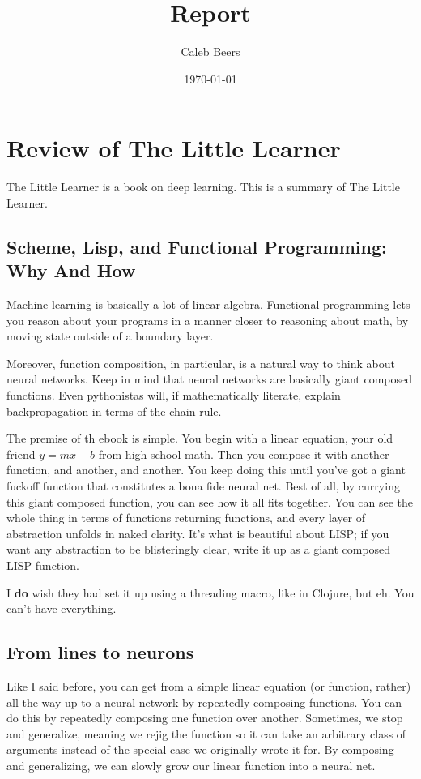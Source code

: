\documentclass[11pt]{article}
\author{Caleb Beers}
\date{\today}
\title{Report}
\begin{document}
\maketitle
\tableofcontents

\section{Review of The Little Learner}
\label{sec:orgade1d67}
The Little Learner is a book on deep learning. This is a summary of The Little Learner.
\subsection{Scheme, Lisp, and Functional Programming: Why And How}
\label{sec:org481af56}
Machine learning is basically a lot of linear algebra. Functional programming lets you reason about your programs in a manner closer to reasoning about math, by moving state outside of a boundary layer.

Moreover, function composition, in particular, is a natural way to think about neural networks. Keep in mind that neural networks are basically giant composed functions. Even pythonistas will, if mathematically literate, explain backpropagation in terms of the chain rule.

The premise of th ebook is simple. You begin with a linear equation, your old friend \(y = mx + b\) from high school math. Then you compose it with another function, and another, and another. You keep doing this until you've got a giant fuckoff function that constitutes a bona fide neural net. Best of all, by currying this giant composed function, you can see how it all fits together. You can see the whole thing in terms of functions returning functions, and every layer of abstraction unfolds in naked clarity. It's what is beautiful about LISP; if you want any abstraction to be blisteringly clear, write it up as a giant composed LISP function.

I \textbf{do} wish they had set it up using a threading macro, like in Clojure, but eh. You can't have everything.
\subsection{From lines to neurons}
\label{sec:orge9a7e80}
Like I said before, you can get from a simple linear equation (or function, rather) all the way up to a neural network by repeatedly composing functions. You can do this by repeatedly composing one function over another. Sometimes, we stop and generalize, meaning we rejig the function so it can take an arbitrary class of arguments instead of the special case we originally wrote it for. By composing and generalizing, we can slowly grow our linear function into a neural net.
\end{document}
